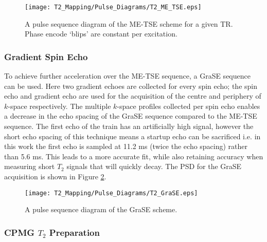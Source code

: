 \begin{figure}[H]
	\centering
	\texttt{[image: T2\_Mapping/Pulse\_Diagrams/T2\_ME\_TSE.eps]}
	\caption{A pulse sequence diagram of the \ac{ME-TSE} scheme for a given \ac{TR}. Phase encode `blips' are constant per excitation.}
	\label{fig:t2_me-tse_seq}	
\end{figure}

\newpage
\subsubsection{Gradient Spin Echo}

To achieve further acceleration over the \acf{ME-TSE} sequence, a \ac{GraSE} sequence can be used. Here two gradient echoes are collected for every spin echo; the spin echo and gradient echo are used for the acquisition of the centre and periphery of $k$-space respectively. The multiple $k$-space profiles collected per spin echo enables a decrease in the echo spacing of the \ac{GraSE} sequence compared to the \ac{ME-TSE} sequence. The first echo of the train has an artificially high signal, however the short echo spacing of this technique means a startup echo can be sacrificed i.e. in this work the first echo is sampled at 11.2 ms (twice the echo spacing) rather than 5.6 ms. This leads to a more accurate fit, while also retaining accuracy when measuring short $T_2$ signals that will quickly decay. The \ac{PSD} for the \ac{GraSE} acquisition is shown in Figure \ref{fig:t2_grase_seq}.

\begin{figure}[H]
	\centering
	\texttt{[image: T2\_Mapping/Pulse\_Diagrams/T2\_GraSE.eps]}
	\caption{A pulse sequence diagram of the \ac{GraSE} scheme.}
	\label{fig:t2_grase_seq}	
\end{figure}

\newpage
\subsubsection{CPMG $T_2$ Preparation}

